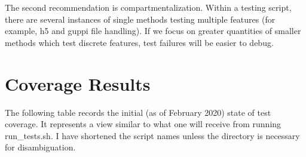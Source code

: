 \documentclass[12pt]{article}
\begin{document}
The second recommendation is compartmentalization. Within a testing script, there are several instances of single methods testing multiple features (for example, h5 and guppi file handling). If we focus on greater quantities of smaller methods which test discrete features, test failures will be easier to debug.

\section{Coverage Results}

\quad \quad The following table records the initial (as of February 2020) state of test coverage. It represents a view similar to what one will receive from running run\_tests.sh. I have shortened the script names unless the directory is necessary for disambiguation.
\end{document}
